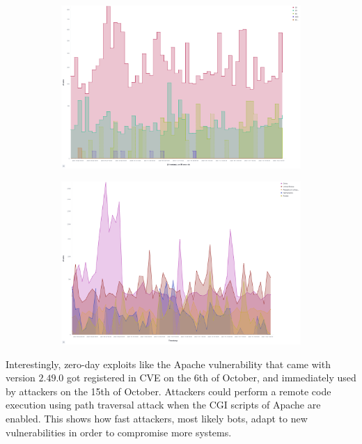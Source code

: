 \begin{figure}
    \centering

    \begin{subfigure}[b]{0.49\textwidth}
        \centering
        \includegraphics[width=\textwidth]{figures/tpot-cowire-attacks.png}
        \caption{}
        \label{fig:tpot-cowire-attacks}
    \end{subfigure}
    \hfill
    \begin{subfigure}[b]{0.49\textwidth}
        \centering
        \includegraphics[width=\textwidth]{figures/tpot-cowire-country.png}
        \caption{}
        \label{fig:tpot-cowire-country}
    \end{subfigure}
    \caption[]{}
    \label{fig:cowire}
\end{figure}

Interestingly, zero-day exploits like the Apache vulnerability \cite{CVE-2021-42013} that came with version $2.49.0$ got registered in CVE on the 6th of October, and immediately used by attackers on the 15th of October.
Attackers could perform a remote code execution using path traversal attack when the CGI scripts of Apache are enabled.
This shows how fast attackers, most likely bots, adapt to new vulnerabilities in order to compromise more systems.

